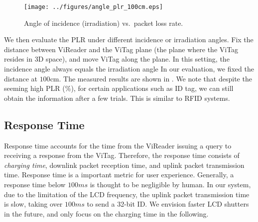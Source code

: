 
\begin{figure}[!ht]
\centering
\texttt{[image: ../figures/angle\_plr\_100cm.eps]}
\vskip -0.05in
\caption{Angle of incidence (irradiation) vs.\ packet loss rate.}\label{fig:readerAoI}
\vskip -0.05in
\end{figure}

We then evaluate the PLR under different incidence or irradiation angles. Fix the distance between ViReader and the ViTag plane (the plane where the ViTag resides in 3D space), and move ViTag along the plane. In this setting, the incidence angle always equals the irradiation angle%
In our evaluation, we fixed the distance at $100$cm. The measured results are shown in . We note that despite the seeming high PLR (\%), for certain applications such as ID tag, we can still obtain the information after a few trials. This is similar to RFID systems. 






\subsection{Response Time}\label{sec:bootstrap}
Response time accounts for the time from the ViReader issuing a query to receiving a response from the ViTag. Therefore, the response time consists of \textit{charging time}, downlink packet reception time, and uplink packet transmission time. Response time is a important metric for user experience. Generally, a response time below $100ms$ is thought to be negligible by human. In our system, due to the limitation of the LCD frequency, the uplink packet transmission time is slow, taking over $100ms$ to send a 32-bit ID. We envision faster LCD shutters in the future, and only focus on the charging time in the following.

